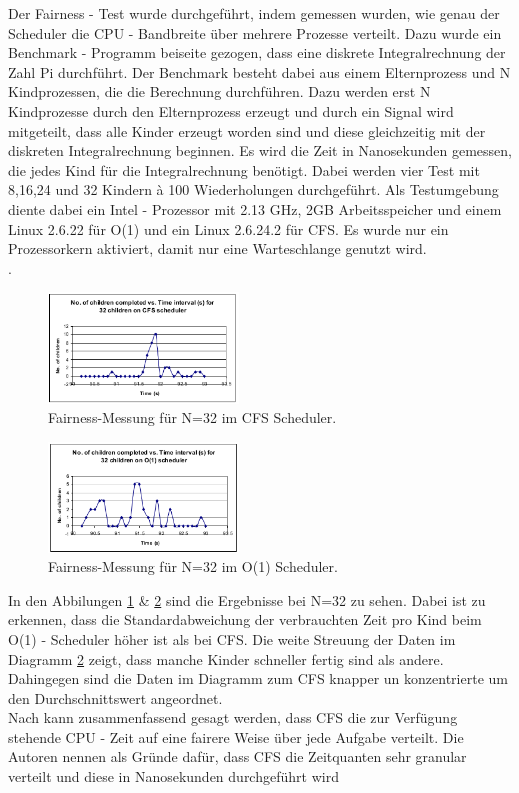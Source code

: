 Der Fairness - Test wurde durchgeführt, indem gemessen wurden, wie genau der Scheduler die CPU - Bandbreite über mehrere Prozesse verteilt. Dazu wurde ein Benchmark - Programm beiseite gezogen, dass eine diskrete Integralrechnung der Zahl Pi durchführt. Der Benchmark besteht dabei aus einem Elternprozess und N Kindprozessen, die die Berechnung durchführen. Dazu werden erst N Kindprozesse durch den Elternprozess erzeugt und durch ein Signal wird mitgeteilt, dass alle Kinder erzeugt worden sind und diese gleichzeitig mit der diskreten Integralrechnung beginnen. Es wird die Zeit in Nanosekunden gemessen, die jedes Kind für die Integralrechnung benötigt. Dabei werden vier Test mit 8,16,24 und 32 Kindern à 100 Wiederholungen durchgeführt. Als Testumgebung diente dabei ein Intel - Prozessor mit 2.13 GHz, 2GB Arbeitsspeicher und einem Linux 2.6.22 für O(1) und ein Linux 2.6.24.2 für CFS. Es wurde nur ein Prozessorkern aktiviert, damit nur eine Warteschlange genutzt wird. \\
. 
\begin{figure} [h]
	\centering
	\includegraphics[width=0.45\textwidth]{pictures/fairness_32_cfs.png}
	\caption{Fairness-Messung für N=32 im CFS Scheduler.}
	\label{fig:fair_meas_cfs}
\end{figure}
\begin{figure} [h]
 	\centering
 	\includegraphics[width=0.45\textwidth]{pictures/fairness_32_O1.png}
 	\caption{Fairness-Messung für N=32 im O(1) Scheduler.}
 	\label{fig:fair_meas_o1}
\end{figure}
In den Abbilungen \ref{fig:fair_meas_cfs} \& \ref{fig:fair_meas_o1} sind die Ergebnisse bei N=32 zu sehen. Dabei ist zu erkennen, dass die Standardabweichung der verbrauchten Zeit pro Kind beim O(1) - Scheduler höher ist als bei CFS. Die weite Streuung der Daten im Diagramm \ref{fig:fair_meas_o1} zeigt, dass manche Kinder schneller fertig sind als andere. Dahingegen sind die Daten im Diagramm zum CFS knapper un konzentrierte um den Durchschnittswert angeordnet. \\
Nach \cite{papercomparison} kann zusammenfassend gesagt werden, dass CFS die zur Verfügung stehende CPU - Zeit auf eine fairere Weise über jede Aufgabe verteilt. Die Autoren nennen als Gründe dafür, dass CFS die Zeitquanten sehr granular verteilt und diese in Nanosekunden durchgeführt wird

